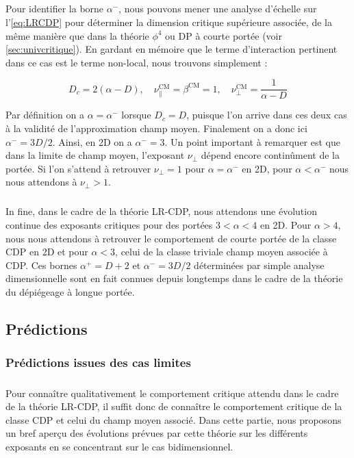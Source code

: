 \subparagraph{}Pour identifier la borne $\alpha^-$, nous pouvons mener une analyse d'échelle sur l'\autoref{eq:LRCDP} pour déterminer la dimension critique supérieure associée, de la même manière que dans la théorie $\phi^4$ ou DP à courte portée (voir \autoref{sec:univcritique}). En gardant en mémoire que le terme d'interaction pertinent dans ce cas est le terme non-local, nous trouvons simplement :

\begin{equation}
	D_c = 2(\alpha-D),\quad \nu_\parallel^\text{CM}= \beta^\text{CM}= 1, \quad \nu_\perp^\text{CM}=\frac{1}{\alpha-D}
\end{equation}

\noindent Par définition on a $\alpha = \alpha^-$ lorsque $D_c=D$, puisque l'on arrive dans ces deux cas à la validité de l'approximation champ moyen. Finalement on a donc ici $\alpha^- = 3D/2$. Ainsi, en 2D on a $\alpha^-=3$. Un point important à remarquer est que dans la limite de champ moyen, l'exposant $\nu_\perp$ dépend encore continûment de la portée. Si l'on s'attend à retrouver $\nu_\perp = 1$ pour $\alpha=\alpha^-$ en 2D, pour $\alpha < \alpha^-$ nous nous attendons à $\nu_\perp > 1$.

\subparagraph{}In fine, dans le cadre de la théorie LR-CDP, nous attendons une évolution continue des exposants critiques pour des portées $3<\alpha<4$ en 2D. Pour $\alpha>4$, nous nous attendons à retrouver le comportement de courte portée de la classe CDP en 2D et pour $\alpha<3$, celui de la classe triviale champ moyen associée à CDP. Ces bornes $\alpha^+ = D+2$ et $\alpha^-=3D/2$ déterminées par simple analyse dimensionnelle sont en fait connues depuis longtemps dans le cadre de la théorie du dépiégeage à longue portée.

\subsection{Prédictions}

\subsubsection{Prédictions issues des cas limites}

\subparagraph{}Pour connaître qualitativement le comportement critique attendu dans le cadre de la théorie LR-CDP, il suffit donc de connaître le comportement critique de la classe CDP et celui du champ moyen associé. Dans cette partie, nous proposons un bref aperçu des évolutions prévues par cette théorie sur les différents exposants en se concentrant sur le cas bidimensionnel.

